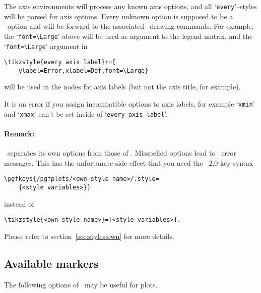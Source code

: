 The axis environments will process any known axis options, and all `\texttt{every}'--styles will be parsed for axis options. Every unknown option is supposed to be a \Tikz\ option and will be forward to the associated \Tikz\ drawing commands. For example, the `\lstinline{font=\Large}' above will be used as argument to the legend matrix, and the `\lstinline{font=\Large}' argument in 
\begin{lstlisting}
\tikzstyle{every axis label}+=[
	ylabel=Error,xlabel=Dof,font=\Large}
\end{lstlisting}
will be used in the nodes for axis labels (but not the axis title, for example).

It is an error if you assign incompatible options to axis labels, for example `\texttt{xmin}' and `\texttt{xmax}' can't be set inside of `\texttt{every axis label}'.

\paragraph{Remark:} \PGFPlots\ separates its own options from those of \Tikz. Misspelled options lead to \Tikz\ error messages. This has the unfortunate side effect that you need the \PGF\ 2.0-key syntax
\begin{lstlisting}
\pgfkeys{/pgfplots/<own style name>/.style=
	{<style variables>}}
\end{lstlisting}
instead of
\begin{lstlisting}
\tikzstyle{<own style name>}=[<style variables>].
\end{lstlisting}
Please refer to section~\ref{sec:styles:own} for more details.






\subsection{Available markers}
\label{sec:markers}%
The following options of \Tikz\ may be useful for plots.
